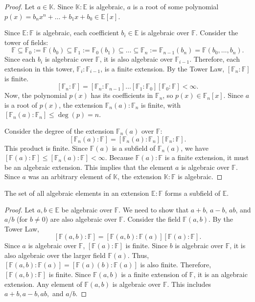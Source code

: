 \begin{proof}
Let $a \in \mathbb{K}$. Since $\mathbb{K}:\mathbb{E}$ is algebraic, $a$ is a root of some polynomial $p(x) = b_n x^n + \dots + b_1 x + b_0 \in \mathbb{E}[x]$.

Since $\mathbb{E}:\mathbb{F}$ is algebraic, each coefficient $b_i \in \mathbb{E}$ is algebraic over $\mathbb{F}$.
Consider the tower of fields:
\[ \mathbb{F} \subseteq \mathbb{F}_0 := \mathbb{F}(b_0) \subseteq \mathbb{F}_1 := \mathbb{F}_0(b_1) \subseteq \dots \subseteq \mathbb{F}_n := \mathbb{F}_{n-1}(b_n) = \mathbb{F}(b_0, \dots, b_n). \]
Since each $b_i$ is algebraic over $\mathbb{F}$, it is also algebraic over $\mathbb{F}_{i-1}$. Therefore, each extension in this tower, $\mathbb{F}_i : \mathbb{F}_{i-1}$, is a finite extension. By the Tower Law, $[\mathbb{F}_n : \mathbb{F}]$ is finite.
\[ [\mathbb{F}_n:\mathbb{F}] = [\mathbb{F}_n:\mathbb{F}_{n-1}] \dots [\mathbb{F}_1:\mathbb{F}_0][\mathbb{F}_0:\mathbb{F}] < \infty. \]
Now, the polynomial $p(x)$ has its coefficients in $\mathbb{F}_n$, so $p(x) \in \mathbb{F}_n[x]$. Since $a$ is a root of $p(x)$, the extension $\mathbb{F}_n(a):\mathbb{F}_n$ is finite, with $[\mathbb{F}_n(a):\mathbb{F}_n] \le \deg(p) = n$.

Consider the degree of the extension $\mathbb{F}_n(a)$ over $\mathbb{F}$:
\[ [\mathbb{F}_n(a):\mathbb{F}] = [\mathbb{F}_n(a):\mathbb{F}_n][\mathbb{F}_n:\mathbb{F}]. \]
This product is finite.
Since $\mathbb{F}(a)$ is a subfield of $\mathbb{F}_n(a)$, we have $[\mathbb{F}(a):\mathbb{F}] \le [\mathbb{F}_n(a):\mathbb{F}] < \infty$.
Because $\mathbb{F}(a):\mathbb{F}$ is a finite extension, it must be an algebraic extension. This implies that the element $a$ is algebraic over $\mathbb{F}$.
Since $a$ was an arbitrary element of $\mathbb{K}$, the extension $\mathbb{K}:\mathbb{F}$ is algebraic.
\end{proof}

\begin{corollary}
The set of all algebraic elements in an extension $\mathbb{E}:\mathbb{F}$ forms a subfield of $\mathbb{E}$. 
\end{corollary}
\begin{proof}
Let $a, b \in \mathbb{E}$ be algebraic over $\mathbb{F}$. We need to show that $a+b$, $a-b$, $ab$, and $a/b$ (for $b \neq 0$) are also algebraic over $\mathbb{F}$.
Consider the field $\mathbb{F}(a,b)$. By the Tower Law,
\[ [\mathbb{F}(a,b):\mathbb{F}] = [\mathbb{F}(a,b):\mathbb{F}(a)][\mathbb{F}(a):\mathbb{F}]. \]
Since $a$ is algebraic over $\mathbb{F}$, $[\mathbb{F}(a):\mathbb{F}]$ is finite.
Since $b$ is algebraic over $\mathbb{F}$, it is also algebraic over the larger field $\mathbb{F}(a)$. Thus, $[\mathbb{F}(a,b):\mathbb{F}(a)] = [\mathbb{F}(a)(b):\mathbb{F}(a)]$ is also finite.
Therefore, $[\mathbb{F}(a,b):\mathbb{F}]$ is finite.
Since $\mathbb{F}(a,b)$ is a finite extension of $\mathbb{F}$, it is an algebraic extension.
Any element of $\mathbb{F}(a,b)$ is algebraic over $\mathbb{F}$. This includes $a+b, a-b, ab,$ and $a/b$.
\end{proof}


